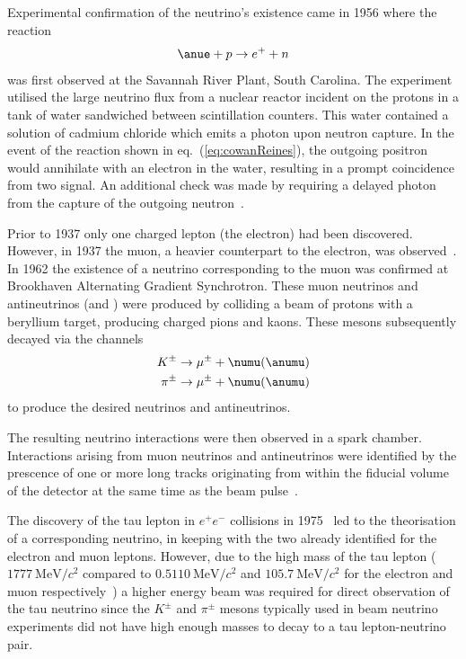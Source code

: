 Experimental confirmation of the neutrino's existence came in 1956 where the reaction
\begin{equation}
  \anue + p \rightarrow e^{+} + n
  \label{eq:cowanReines}
\end{equation}
was first observed at the Savannah River Plant, South Carolina. The experiment utilised the large neutrino flux from a nuclear reactor incident on the protons in a tank of water sandwiched between scintillation counters.
This water contained a solution of cadmium chloride which emits a photon upon neutron capture.
In the event of the reaction shown in eq.~(\ref{eq:cowanReines}), the outgoing positron would annihilate with an electron in the water, resulting in a prompt coincidence from two signal.
An additional check was made by requiring a delayed photon from the capture of the outgoing neutron~\cite{cowanReines}.

Prior to 1937 only one charged lepton (the electron) had been discovered.
However, in 1937 the muon, a heavier counterpart to the electron, was observed~\cite{muonDiscovery}.
In 1962 the existence of a neutrino corresponding to the muon was confirmed at Brookhaven Alternating Gradient Synchrotron.
These muon neutrinos and antineutrinos (\numu and \anumu) were produced by colliding a beam of protons with a beryllium target, producing charged pions and kaons.
These mesons subsequently decayed via the channels
\begin{align}
    K^{\pm} \rightarrow \mu^{\pm} + \numu(\anumu) \\
    \pi^{\pm} \rightarrow \mu^{\pm} + \numu(\anumu)
\end{align}
to produce the desired neutrinos and antineutrinos.

The resulting neutrino interactions were then observed in a spark chamber.
Interactions arising from muon neutrinos and antineutrinos were identified by the prescence of one or more long tracks originating from within the fiducial volume of the detector at the same time as the beam pulse~\cite{numuDiscovery}.   

The discovery of the tau lepton in $e^{+}e^{-}$ collisions in 1975~\cite{tauLepton} led to the theorisation of a corresponding neutrino, in keeping with the two already identified for the electron and muon leptons.
However, due to the high mass of the tau lepton ($1777~\text{MeV}/c^{2}$ compared to $0.5110~\text{MeV}/c^{2}$ and $105.7~\text{MeV}/c^{2}$ for the electron and muon respectively~\cite{pdg2018}) a higher energy beam was required for direct observation of the tau neutrino since the $K^{\pm}$ and $\pi^{\pm}$ mesons typically used in beam neutrino experiments did not have high enough masses to decay to a tau lepton-neutrino pair.


